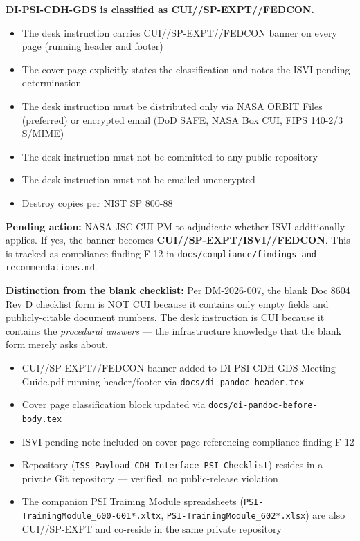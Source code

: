 {\begin{enumerate}
\textbf{DI-PSI-CDH-GDS is classified as CUI//SP-EXPT//FEDCON.}

\begin{itemize}
    \item The desk instruction carries CUI//SP-EXPT//FEDCON banner on every page (running header and footer)
    \item The cover page explicitly states the classification and notes the ISVI-pending determination
    \item The desk instruction must be distributed only via NASA ORBIT Files (preferred) or encrypted email (DoD SAFE, NASA Box CUI, FIPS 140-2/3 S/MIME)
    \item The desk instruction must not be committed to any public repository
    \item The desk instruction must not be emailed unencrypted
    \item Destroy copies per NIST SP 800-88
\end{itemize}

\textbf{Pending action:} NASA JSC CUI PM to adjudicate whether ISVI additionally applies. If yes, the banner becomes \textbf{CUI//SP-EXPT/ISVI//FEDCON}. This is tracked as compliance finding F-12 in \texttt{docs/compliance/findings-and-recommendations.md}.

\textbf{Distinction from the blank checklist:} Per DM-2026-007, the blank Doc 8604 Rev D checklist form is NOT CUI because it contains only empty fields and publicly-citable document numbers. The desk instruction is CUI because it contains the \textit{procedural answers} --- the infrastructure knowledge that the blank form merely asks about.


\begin{itemize}
    \item CUI//SP-EXPT//FEDCON banner added to DI-PSI-CDH-GDS-Meeting-Guide.pdf running header/footer via \texttt{docs/di-pandoc-header.tex}
    \item Cover page classification block updated via \texttt{docs/di-pandoc-before-body.tex}
    \item ISVI-pending note included on cover page referencing compliance finding F-12
    \item Repository (\texttt{ISS\_Payload\_CDH\_Interface\_PSI\_Checklist}) resides in a private Git repository --- verified, no public-release violation
    \item The companion PSI Training Module spreadsheets (\texttt{PSI-TrainingModule\_600-601*.xltx}, \texttt{PSI-TrainingModule\_602*.xlsx}) are also CUI//SP-EXPT and co-reside in the same private repository
\end{itemize}


\end{enumerate}}
